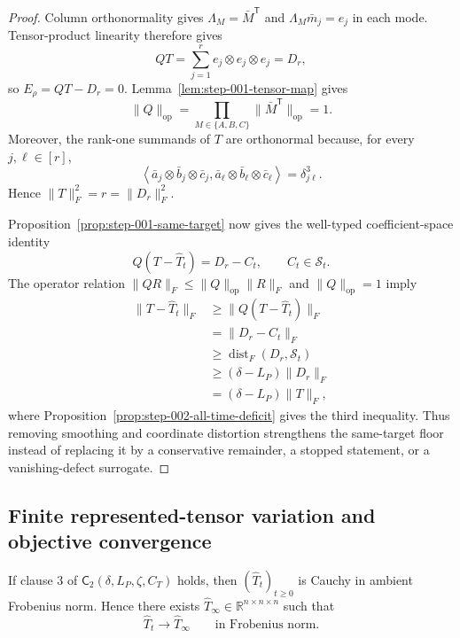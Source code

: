 \begin{proof}
Column orthonormality gives $\Lambda_M=\bar M^{\mathsf T}$ and
$\Lambda_M\bar m_j=e_j$ in each mode.  Tensor-product linearity therefore
gives
\[
QT=\sum_{j=1}^re_j\otimes e_j\otimes e_j=D_r,
\]
so $E_\rho=QT-D_r=0$.  Lemma~\ref{lem:step-001-tensor-map} gives
\[
\|Q\|_{\mathrm{op}}
=\prod_{M\in\{A,B,C\}}\|\bar M^{\mathsf T}\|_{\mathrm{op}}=1.
\]
Moreover, the rank-one summands of $T$ are orthonormal because, for every
$j,\ell\in[r]$,
\[
\left\langle
\bar a_j\otimes\bar b_j\otimes\bar c_j,
\bar a_\ell\otimes\bar b_\ell\otimes\bar c_\ell
\right\rangle
=\delta_{j\ell}^3.
\]
Hence $\|T\|_F^2=r=\|D_r\|_F^2$.

Proposition~\ref{prop:step-001-same-target} now gives the well-typed
coefficient-space identity
\[
Q(T-\widehat T_t)=D_r-C_t,
\qquad C_t\in\mathcal S_t.
\]
The operator relation $\|QR\|_F\leq\|Q\|_{\mathrm{op}}\|R\|_F$ and
$\|Q\|_{\mathrm{op}}=1$ imply
\[
\begin{aligned}
\|T-\widehat T_t\|_F
&\geq\|Q(T-\widehat T_t)\|_F\\
&=\|D_r-C_t\|_F\\
&\geq\operatorname{dist}_F(D_r,\mathcal S_t)\\
&\geq(\delta-L_P)\|D_r\|_F\\
&=(\delta-L_P)\|T\|_F,
\end{aligned}
\]
where Proposition~\ref{prop:step-002-all-time-deficit} gives the third
inequality.  Thus removing smoothing and coordinate distortion strengthens
the same-target floor instead of replacing it by a conservative remainder,
a stopped statement, or a vanishing-defect surrogate.
\end{proof}

\subsection{Finite represented-tensor variation and objective convergence}
\label{app:step-004}

\begin{lemma}
\label{lem:step-004-finite-variation}
If clause 3 of $\mathsf C_2(\delta,L_P,\zeta,C_T)$ holds, then
$(\widehat T_t)_{t\geq0}$ is Cauchy in ambient Frobenius norm.  Hence there
exists $\widehat T_\infty\in\mathbb R^{n\times n\times n}$ such that
\[
\widehat T_t\longrightarrow\widehat T_\infty
\qquad\text{in Frobenius norm}.
\]
\end{lemma}

